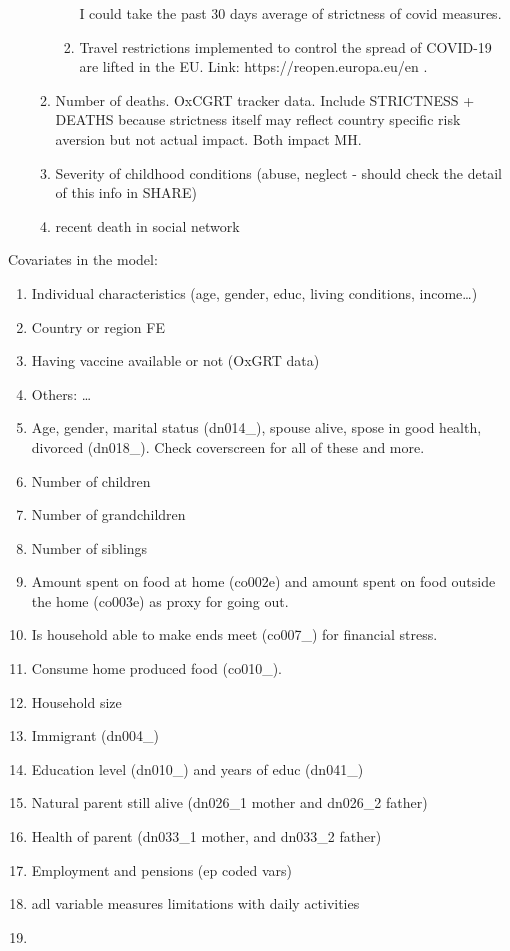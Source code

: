 \documentclass{article}
\begin{document}
\begin{enumerate}
\begin{enumerate}
\begin{enumerate}
\begin{enumerate}
                    \end{enumerate}
                    I could take the past 30 days average of strictness of covid measures. 
                    \item Travel restrictions implemented to control the spread of COVID-19 are lifted in the EU. \newline Link: https://reopen.europa.eu/en . 
                \end{enumerate}
            \item Number of deaths. OxCGRT tracker data. Include STRICTNESS + DEATHS because strictness itself may reflect country specific risk aversion but not actual impact. Both impact MH.
            \item Severity of childhood conditions (abuse, neglect - should check the detail of this info in SHARE)
            \item recent death in social network
        \end{enumerate}
\end{enumerate}
Covariates in the model: 
\begin{enumerate}
    \item Individual characteristics (age, gender, educ, living conditions, income\dots)
    \item Country or region FE
    \item Having vaccine available or not (OxGRT data)
    \item Others: \dots
    \item Age, gender, marital status (dn014\_), spouse alive, spose in good health, divorced (dn018\_). Check coverscreen for all of these and more.
    \item Number of children
    \item Number of grandchildren
    \item Number of siblings
    \item Amount spent on food at home (co002e) and amount spent on food outside the home (co003e) as proxy for going out.
    \item Is household able to make ends meet (co007\_) for financial stress.
    \item Consume home produced food (co010\_).
    \item Household size
    \item Immigrant (dn004\_)
    \item Education level (dn010\_) and years of educ (dn041\_)
    \item Natural parent still alive (dn026\_1 mother and dn026\_2 father)
    \item Health of parent (dn033\_1 mother, and dn033\_2 father)
    \item Employment and pensions (ep coded vars)
    \item adl variable measures limitations with daily activities
    \item 
\end{enumerate}
\end{document}
